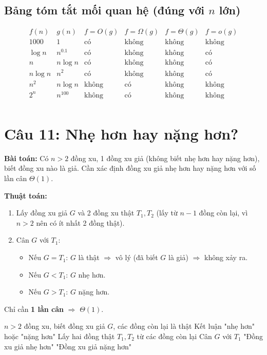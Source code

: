 \documentclass[12pt,a4paper]{article}
\begin{document}
\subsection*{Bảng tóm tắt mối quan hệ (đúng với $n$ lớn)}
\[
\begin{array}{c|c|c|c|c|c}
f(n) & g(n) & f=O(g) & f=\Omega(g) & f=\Theta(g) & f=o(g) \\
\hline
1000 & 1 & \text{có} & \text{không} & \text{không} & \text{không} \\
\log n & n^{0.1} & \text{có} & \text{không} & \text{không} & \text{có} \\
n & n\log n & \text{có} & \text{không} & \text{không} & \text{có} \\
n\log n & n^2 & \text{có} & \text{không} & \text{không} & \text{có} \\
n^2 & n\log n & \text{không} & \text{có} & \text{không} & \text{không} \\
2^n & n^{100} & \text{không} & \text{có} & \text{không} & \text{không} \\
\end{array}
\]

\section*{Câu 11: Nhẹ hơn hay nặng hơn?}

\textbf{Bài toán:} Có $n > 2$ đồng xu, 1 đồng xu giả (không biết nhẹ hơn hay nặng hơn), biết đồng xu nào là giả. Cần xác định đồng xu giả nhẹ hơn hay nặng hơn với số lần cân $\Theta(1)$.

\textbf{Thuật toán:}
\begin{enumerate}
    \item Lấy đồng xu giả $G$ và 2 đồng xu thật $T_1, T_2$ (lấy từ $n-1$ đồng còn lại, vì $n>2$ nên có ít nhất 2 đồng thật).
    \item Cân $G$ với $T_1$:
    \begin{itemize}
        \item Nếu $G = T_1$: $G$ là thật $\Rightarrow$ vô lý (đã biết $G$ là giả) $\Rightarrow$ không xảy ra.
        \item Nếu $G < T_1$: $G$ nhẹ hơn.
        \item Nếu $G > T_1$: $G$ nặng hơn.
    \end{itemize}
\end{enumerate}
Chỉ cần \textbf{1 lần cân} $\Rightarrow$ $\Theta(1)$.

\begin{algorithm}[H]
\caption{Xác định đồng xu giả nhẹ hay nặng}
\begin{algorithmic}
\REQUIRE $n>2$ đồng xu, biết đồng xu giả $G$, các đồng còn lại là thật
\ENSURE Kết luận "nhẹ hơn" hoặc "nặng hơn"
\STATE Lấy hai đồng thật $T_1, T_2$ từ các đồng còn lại
\STATE Cân $G$ với $T_1$
    \RETURN "Đồng xu giả nhẹ hơn"
    \RETURN "Đồng xu giả nặng hơn"
\ENDIF
\end{algorithmic}
\end{algorithm}
\end{document}
